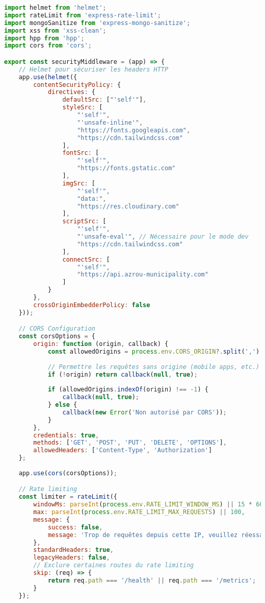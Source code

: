 \begin{lstlisting}[language=JavaScript, caption=security-middleware.js]
import helmet from 'helmet';
import rateLimit from 'express-rate-limit';
import mongoSanitize from 'express-mongo-sanitize';
import xss from 'xss-clean';
import hpp from 'hpp';
import cors from 'cors';

export const securityMiddleware = (app) => {
    // Helmet pour sécuriser les headers HTTP
    app.use(helmet({
        contentSecurityPolicy: {
            directives: {
                defaultSrc: ["'self'"],
                styleSrc: [
                    "'self'", 
                    "'unsafe-inline'", 
                    "https://fonts.googleapis.com",
                    "https://cdn.tailwindcss.com"
                ],
                fontSrc: [
                    "'self'", 
                    "https://fonts.gstatic.com"
                ],
                imgSrc: [
                    "'self'", 
                    "data:", 
                    "https://res.cloudinary.com"
                ],
                scriptSrc: [
                    "'self'",
                    "'unsafe-eval'", // Nécessaire pour le mode dev
                    "https://cdn.tailwindcss.com"
                ],
                connectSrc: [
                    "'self'",
                    "https://api.azrou-municipality.com"
                ]
            }
        },
        crossOriginEmbedderPolicy: false
    }));

    // CORS Configuration
    const corsOptions = {
        origin: function (origin, callback) {
            const allowedOrigins = process.env.CORS_ORIGIN?.split(',') || ['http://localhost:3000'];
            
            // Permettre les requêtes sans origine (mobile apps, etc.)
            if (!origin) return callback(null, true);
            
            if (allowedOrigins.indexOf(origin) !== -1) {
                callback(null, true);
            } else {
                callback(new Error('Non autorisé par CORS'));
            }
        },
        credentials: true,
        methods: ['GET', 'POST', 'PUT', 'DELETE', 'OPTIONS'],
        allowedHeaders: ['Content-Type', 'Authorization']
    };
    
    app.use(cors(corsOptions));

    // Rate limiting
    const limiter = rateLimit({
        windowMs: parseInt(process.env.RATE_LIMIT_WINDOW_MS) || 15 * 60 * 1000,
        max: parseInt(process.env.RATE_LIMIT_MAX_REQUESTS) || 100,
        message: {
            success: false,
            message: 'Trop de requêtes depuis cette IP, veuillez réessayer plus tard.'
        },
        standardHeaders: true,
        legacyHeaders: false,
        // Exclure certaines routes du rate limiting
        skip: (req) => {
            return req.path === '/health' || req.path === '/metrics';
        }
    });
    

\end{lstlisting}
